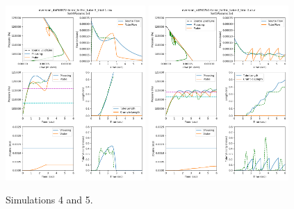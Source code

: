 \documentclass[letterpaper]{article}
\begin{document}
\begin{figure}\centering
\includegraphics[width=0.475\textwidth]{Set4result28-Jul.png}
\includegraphics[width=0.475\textwidth]{Set5result28-Jul.png}
\caption{Simulations 4 and 5.}
\end{figure}
\end{document}
